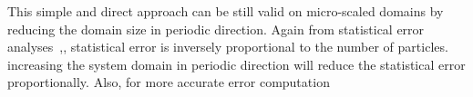 \documentclass[conference,final]{IEEEtran}
\begin{document}
%



This simple and direct approach can be still valid on micro-scaled domains by reducing the domain size in periodic direction. Again from statistical error analyses~\cite{Hadjicon2},\cite{Time_Mechanism}, statistical error is inversely proportional to the number of particles. increasing the system domain in periodic direction will reduce the statistical error proportionally. Also, for more accurate error computation
\end{document}

